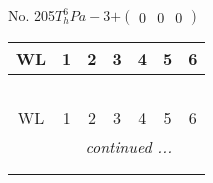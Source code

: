\documentclass[fleqn,9pt,landscape]{jsarticle}
\begin{document}
\begin{center}
\begin{longtable}{ccccccc}
\end{longtable}
\end{center}
\newpage
No. 205\quad$T_{h}^{6}$\quad$Pa-3$\quad[ cubic ]\quad$+\begin{pmatrix} 0 & 0 & 0 \end{pmatrix}$
\begin{center}
\renewcommand{\arraystretch}{1.2}
\begin{longtable}{ccccccc}
 \hline \hline
WL & 1 & 2 & 3 & 4 & 5 & 6 \\ \hline \endfirsthead

\multicolumn{6}{l}{\tablename\ \thetable{}} \\
 \hline \hline
WL & 1 & 2 & 3 & 4 & 5 & 6 \\ \hline \endhead

 \hline \hline
\multicolumn{6}{r}{\footnotesize\it continued ...} \\ \endfoot

 \hline \hline
\multicolumn{6}{r}{} \\ \endlastfoot


\end{longtable}
\end{center}
\end{document}
